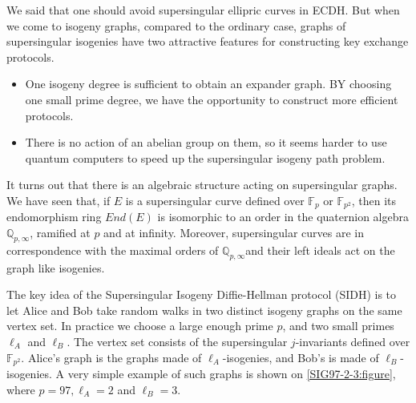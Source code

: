 \documentclass{article}
\theoremstyle{theorem}
\theoremstyle{definition}
\begin{document}
We said that one should avoid supersingular ellipric curves in ECDH. But when we come to isogeny graphs, compared to the ordinary case, graphs of supersingular isogenies have two attractive features for constructing key exchange protocols. 
	\begin{itemize}
		\item One isogeny degree is sufficient to obtain an expander graph. BY choosing one small prime degree, we have the opportunity to construct more efficient protocols.
		
		\item  There is no action of an abelian group on them, so it seems harder to use quantum computers to speed up the supersingular isogeny path problem.
	\end{itemize}

It turns out that there is an algebraic structure acting on supersingular graphs. We have seen that, if $E$ is a supersingular curve defined over $\mathbb{F}_p$ or $\mathbb{F}_{p^2}$, then its endomorphism ring $End(E)$ is isomorphic to an order in the quaternion algebra $\mathbb{Q}_{p,\infty}$, ramified at $p$ and at infinity. Moreover, supersingular curves are in correspondence with the maximal orders of $\mathbb{Q}_{p, \infty}$and their left ideals act on the graph like isogenies.

The key idea of the Supersingular Isogeny Diffie-Hellman protocol (SIDH) is to let Alice and Bob take random walks in two distinct isogeny graphs on the same vertex set. In practice we choose a large enough prime $p$, and two small primes $\ell_A$ and $\ell_B$. The vertex set consists of the supersingular $j$-invariants defined over $\mathbb{F}_{p^2}$. Alice's graph is the graphs made of $\ell_A$-isogenies, and Bob's is made of $\ell_B$-isogenies. A very simple example of such graphs is shown on \cref{SIG97-2-3:figure}, where $p = 97, \ell_A = 2$ and $\ell_B = 3$.
\end{document}

